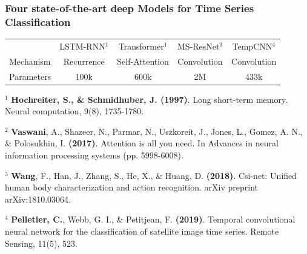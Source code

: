 

\begin{frame}
\frametitle{Four state-of-the-art deep Models for Time Series Classification}

\centering\begin{tabular}{lcccc}
	\toprule
	& LSTM-RNN$^1$ & Transformer$^1$ & MS-ResNet$^3$ & TempCNN$^4$ \\
	\cmidrule(lr){2-2}\cmidrule(lr){3-3}\cmidrule(lr){4-4}\cmidrule(lr){5-5}
	Mechanism & Recurrence & Self-Attention & Convolution & Convolution \\
	Parameters & 100k & 600k & 2M & 433k \\
	\bottomrule
\end{tabular}

\vspace{4em}

{\footnotesize\raggedright

$^1$ \textbf{Hochreiter, S., \& Schmidhuber, J. (1997)}. Long short-term memory. Neural computation, 9(8), 1735-1780.

$^2$ \textbf{Vaswani}, A., Shazeer, N., Parmar, N., Uszkoreit, J., Jones, L., Gomez, A. N., \& Polosukhin, I. \textbf{(2017)}. Attention is all you need. In Advances in neural information processing systems (pp. 5998-6008).

$^3$ \textbf{Wang}, F., Han, J., Zhang, S., He, X., \& Huang, D. \textbf{(2018)}. Csi-net: Unified human body characterization and action recognition. arXiv preprint arXiv:1810.03064.

$^4$ \textbf{Pelletier, C.}, Webb, G. I., \& Petitjean, F. \textbf{(2019)}. Temporal convolutional neural network for the classification of satellite image time series. Remote Sensing, 11(5), 523.

}

\end{frame}


